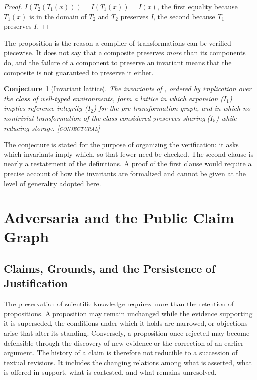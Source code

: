 \documentclass[11pt,twoside,openright]{book}
\theoremstyle{plain}
\newtheorem{conjecture}[theorem]{Conjecture}
\theoremstyle{definition}
\theoremstyle{remark}
\newcommand{\Conj}{\textup{\textsc{[conjectural]}}}
\begin{document}
\begin{proof}
$I(T_2(T_1(x)))=I(T_1(x))=I(x)$, the first equality because $T_1(x)$ is in the domain of $T_2$ and $T_2$ preserves $I$, the second because $T_1$ preserves $I$.
\end{proof}

The proposition is the reason a compiler of transformations can be verified piecewise. It does not say that a composite preserves \emph{more} than its components do, and the failure of a component to preserve an invariant means that the composite is not guaranteed to preserve it either.

\begin{conjecture}[Invariant lattice]\label{conj:lattice}
The invariants of , ordered by implication over the class of well-typed environments, form a lattice in which expansion ($I_1$) implies reference integrity ($I_2$) for the pre-transformation graph, and in which no nontrivial transformation of the class considered preserves sharing ($I_5$) while reducing storage.
\Conj{}
\end{conjecture}

The conjecture is stated for the purpose of organizing the verification: it asks which invariants imply which, so that fewer need be checked. The second clause is nearly a restatement of the definitions. A proof of the first clause would require a precise account of how the invariants are formalized and cannot be given at the level of generality adopted here.


\chapter{Adversaria and the Public Claim Graph}
\label{ch:adversaria}

\section{Claims, Grounds, and the Persistence of Justification}

The preservation of scientific knowledge requires more than the
retention of propositions. A proposition may remain unchanged
while the evidence supporting it is superseded, the conditions
under which it holds are narrowed, or objections arise that
alter its standing. Conversely, a proposition once rejected
may become defensible through the discovery of new evidence
or the correction of an earlier argument. The history of a
claim is therefore not reducible to a succession of textual
revisions. It includes the changing relations among what is
asserted, what is offered in support, what is contested, and
what remains unresolved.
\end{document}
